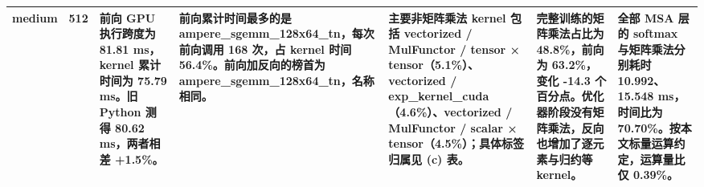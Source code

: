\begin{tabular}{lrlllll}
medium & 512 & 前向 GPU 执行跨度为 81.81 ms，kernel 累计时间为 75.79 ms。旧 Python 测得 80.62 ms，两者相差 +1.5\%。 & 前向累计时间最多的是 ampere\_sgemm\_128x64\_tn，每次前向调用 168 次，占 kernel 时间 56.4\%。前向加反向的榜首为 ampere\_sgemm\_128x64\_tn，名称相同。 & 主要非矩阵乘法 kernel 包括 vectorized / MulFunctor / tensor × tensor（5.1\%）、vectorized / exp\_kernel\_cuda（4.6\%）、vectorized / MulFunctor / scalar × tensor（4.5\%）；具体标签归属见 (c) 表。 & 完整训练的矩阵乘法占比为 48.8\%，前向为 63.2\%，变化 -14.3 个百分点。优化器阶段没有矩阵乘法，反向也增加了逐元素与归约等 kernel。 & 全部 MSA 层的 softmax 与矩阵乘法分别耗时 10.992、15.548 ms，时间比为 70.70\%。按本文标量运算约定，运算量比仅 0.39\%。 \\
\bottomrule
\end{tabular}
